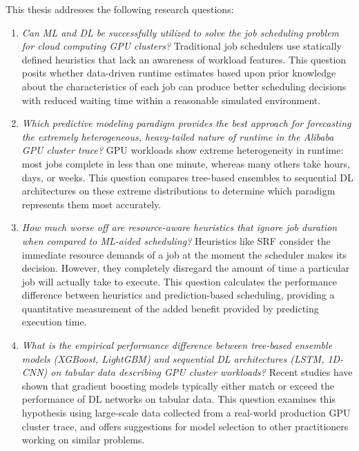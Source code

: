 This thesis addresses the following research questions:
\begin{enumerate}
    \item \textit{Can ML and DL be successfully utilized to solve the job scheduling problem for cloud computing GPU clusters?} Traditional job schedulers use statically defined heuristics that lack an awareness of workload features. This question posits whether data-driven runtime estimates based upon prior knowledge about the characteristics of each job can produce better scheduling decisions with reduced waiting time within a reasonable simulated environment.

    \item \textit{Which predictive modeling paradigm provides the best approach for forecasting the extremely heterogeneous, heavy-tailed nature of runtime in the Alibaba GPU cluster trace?} GPU workloads show extreme heterogeneity in runtime: most jobs complete in less than one minute, whereas many others take hours, days, or weeks. This question compares tree-based ensembles to sequential DL architectures on these extreme distributions to determine which paradigm represents them most accurately.

    \item \textit{How much worse off are resource-aware heuristics that ignore job duration when compared to ML-aided scheduling?} Heuristics like SRF consider the immediate resource demands of a job at the moment the scheduler makes its decision. However, they completely disregard the amount of time a particular job will actually take to execute. This question calculates the performance difference between heuristics and prediction-based scheduling, providing a quantitative measurement of the added benefit provided by predicting execution time.

    \item \textit{What is the empirical performance difference between tree-based ensemble models (XGBoost, LightGBM) and sequential DL architectures (LSTM, 1D-CNN) on tabular data describing GPU cluster workloads?} Recent studies have shown that gradient boosting models typically either match or exceed the performance of DL networks on tabular data. This question examines this hypothesis using large-scale data collected from a real-world production GPU cluster trace, and offers suggestions for model selection to other practitioners working on similar problems.
\end{enumerate}

